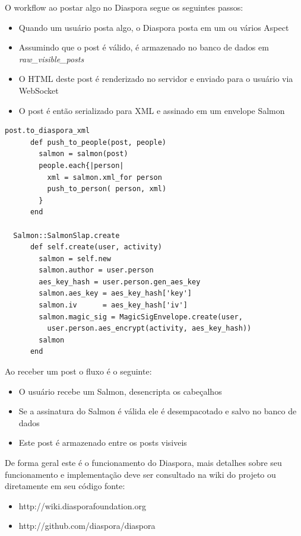 \documentclass[12pt]{article}
\begin{document}
O workflow ao postar algo no Diaspora segue os seguintes passos:

\begin{itemize}
  \item Quando um usuário posta algo, o Diaspora posta em um ou vários Aspect
  \item Assumindo que o post é válido, é armazenado no banco de dados em {\it raw\_visible\_posts}
  \item O HTML deste post é renderizado no servidor e enviado para o usuário via WebSocket\cite{websocket}
  \item O post é então serializado para XML e assinado em um envelope Salmon
\end{itemize}

\begin{framed}
\begin{lstlisting}[caption=Exemplo envio de mensagem e como o Diaspora serializa em XML]
  post.to_diaspora_xml
      def push_to_people(post, people)
        salmon = salmon(post)
        people.each{|person|
          xml = salmon.xml_for person
          push_to_person( person, xml)
        }
      end
  
  Salmon::SalmonSlap.create
      def self.create(user, activity)
        salmon = self.new
        salmon.author = user.person
        aes_key_hash = user.person.gen_aes_key
        salmon.aes_key = aes_key_hash['key']
        salmon.iv      = aes_key_hash['iv']
        salmon.magic_sig = MagicSigEnvelope.create(user,
          user.person.aes_encrypt(activity, aes_key_hash))
        salmon
      end
\end{lstlisting}
\end{framed}

Ao receber um post o fluxo é o seguinte:

\begin{itemize}
  \item O usuário recebe um Salmon, desencripta os cabeçalhos
  \item Se a assinatura do Salmon é válida ele é desempacotado e salvo no banco de dados
  \item Este post é armazenado entre os posts visiveis
\end{itemize}

De forma geral este é o funcionamento do Diaspora, mais detalhes sobre seu
funcionamento e implementação deve ser consultado na wiki do projeto ou
diretamente em seu código fonte:

\begin{itemize}
  \item http://wiki.diasporafoundation.org
  \item http://github.com/diaspora/diaspora
\end{itemize}
\end{document}
